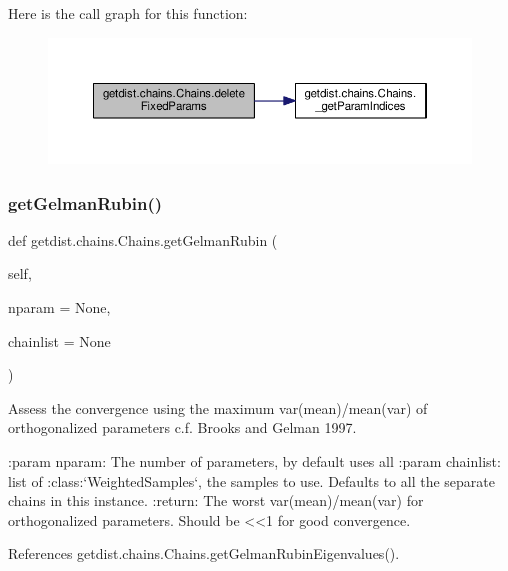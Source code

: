 Here is the call graph for this function\+:
\nopagebreak
\begin{figure}[H]
\begin{center}
\leavevmode
\includegraphics[width=350pt]{classgetdist_1_1chains_1_1Chains_ad4e95f9abe55474a9d7a9d4245190cdd_cgraph}
\end{center}
\end{figure}
\mbox{\label{classgetdist_1_1chains_1_1Chains_a2f1bea2051f7de3e3b5cf65cbfab872d}} 
\subsubsection{\texorpdfstring{get\+Gelman\+Rubin()}{getGelmanRubin()}}
{\footnotesize\ttfamily def getdist.\+chains.\+Chains.\+get\+Gelman\+Rubin (\begin{DoxyParamCaption}\item[{}]{self,  }\item[{}]{nparam = {\ttfamily None},  }\item[{}]{chainlist = {\ttfamily None} }\end{DoxyParamCaption})}

\begin{DoxyVerb}Assess the convergence using the maximum var(mean)/mean(var) of orthogonalized parameters
c.f. Brooks and Gelman 1997.

:param nparam: The number of parameters, by default uses all
:param chainlist: list of :class:`WeightedSamples`, the samples to use. Defaults to all the separate chains in this instance.
:return: The worst var(mean)/mean(var) for orthogonalized parameters. Should be <<1 for good convergence.
\end{DoxyVerb}
 

References getdist.\+chains.\+Chains.\+get\+Gelman\+Rubin\+Eigenvalues().


